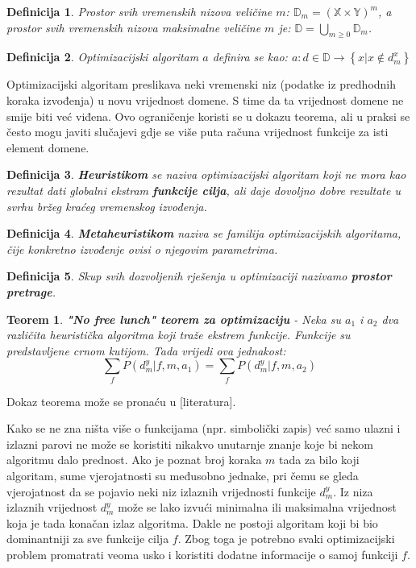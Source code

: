 \documentclass[times, utf8, diplomski, numeric]{fer}
\newtheorem{definition}{Definicija}
\newtheorem{theorem}{Teorem}
\begin{document}
\begin{definition}
Prostor svih vremenskih nizova veličine $m$: $\mathbb{D}_m = (\mathbb{X} \times \mathbb{Y})^m$, a prostor svih vremenskih nizova maksimalne veličine $m$ je: $\mathbb{D} = \bigcup_{m\ge0}\mathbb{D}_m$.
\end{definition}

\begin{definition}
Optimizacijski algoritam $a$ definira se kao: $a : d \in \mathbb{D} \rightarrow \left \{x | x \notin d_m^x \right \}$
\end{definition}

Optimizacijski algoritam preslikava neki vremenski niz (podatke iz predhodnih koraka izvođenja) u novu vrijednost domene. S time da ta vrijednost domene ne smije biti već viđena. Ovo ograničenje koristi se u dokazu teorema, ali u praksi se često mogu javiti slučajevi gdje se više puta računa vrijednost funkcije za isti element domene.

\begin{definition}
\textbf{Heuristikom} se naziva optimizacijski algoritam koji ne mora kao rezultat dati globalni ekstram \textbf{funkcije cilja}, ali daje dovoljno dobre rezultate u svrhu bržeg kraćeg vremenskog izvođenja. 
\end{definition}

\begin{definition}
\textbf{Metaheuristikom} naziva se familija optimizacijskih algoritama, čije konkretno izvođenje ovisi o njegovim parametrima.
\end{definition}

\begin{definition}
Skup svih dozvoljenih rješenja u optimizaciji nazivamo \textbf{prostor pretrage}.
\end{definition}

\begin{theorem}
\label{thm:nofreelunch}
\textbf{"No free lunch" teorem za optimizaciju} - Neka su $a_1$ i $a_2$ dva različita heuristička algoritma koji traže ekstrem funkcije. Funkcije su predstavljene crnom kutijom. Tada vrijedi ova jednakost:
\begin{equation}
	\sum_{f}P(d_m^y|f,m,a_1) = \sum_{f}P(d_m^y|f,m,a_2)
\end{equation}
\end{theorem}

Dokaz teorema može se pronaću u [literatura].

Kako se ne zna ništa više o funkcijama (npr. simbolički zapis) već samo ulazni i izlazni parovi ne može se koristiti nikakvo unutarnje znanje koje bi nekom algoritmu dalo prednost. Ako je poznat broj koraka $m$ tada za bilo koji algoritam, sume vjerojatnosti su međusobno jednake, pri čemu se gleda vjerojatnost da se pojavio neki niz izlaznih vrijednosti funkcije $d_m^y$.
Iz niza izlaznih vrijednost $d_m^y$ može se lako izvući minimalna ili maksimalna vrijednost koja je tada konačan izlaz algoritma. Dakle ne postoji algoritam koji bi bio dominantniji za sve funkcije cilja $f$. Zbog toga je potrebno svaki optimizacijski problem promatrati veoma usko i koristiti dodatne informacije o samoj funkciji $f$.
\end{document}
